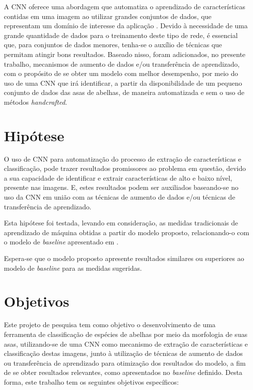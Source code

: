 \documentclass[
	12pt,				%
	oneside,			%
	a4paper,			%
	english,			%
	brazil				%
	]{abntex2ppgsi}
\begin{document}
A CNN oferece uma abordagem que automatiza o aprendizado de características contidas em uma imagem ao utilizar grandes conjuntos de dados, que representam um domínio de interesse da aplicação \cite{gonzalez2018deep}. Devido à necessidade de uma grande quantidade de dados para o treinamento deste tipo de rede, é essencial que, para conjuntos de dados menores, tenha-se o auxílio de técnicas que permitam atingir bons resultados. Baseado nisso, foram adicionados, no presente trabalho, mecanismos de aumento de dados e/ou transferência de aprendizado, com o propósito de se obter um modelo com melhor desempenho, por meio do uso de uma CNN que irá identificar, a partir da disponibilidade de um pequeno conjunto de dados das asas de abelhas, de maneira automatizada e sem o uso de métodos \textit{handcrafted}.

\section{Hipótese}
O uso de CNN para automatização do processo de extração de características e classificação, pode trazer resultados promissores ao problema em questão, devido a sua capacidade de identificar e extrair características de alto e baixo nível, presente nas imagens. E, estes resultados podem ser auxiliados baseando-se no uso da CNN em união com as técnicas de aumento de dados e/ou técnicas de transferência de aprendizado.

Esta hipótese foi testada, levando em consideração, as medidas tradicionais de aprendizado de máquina obtidas a partir do modelo proposto, relacionando-o com o modelo de \textit{baseline} apresentado em .

Espera-se que o modelo proposto apresente resultados similares ou superiores ao modelo de \textit{baseline} para as medidas sugeridas.

\section{Objetivos}
Este projeto de pesquisa tem como objetivo o desenvolvimento de uma ferramenta de classificação de espécies de abelhas por meio da morfologia de suas asas, utilizando-se de uma CNN como mecanismo de extração de características e classificação destas imagens, junto à utilização de técnicas de aumento de dados ou transferência de aprendizado para otimização dos resultados do modelo, a fim de se obter resultados relevantes, como apresentados no \textit{baseline} definido. Desta forma, este trabalho tem os seguintes objetivos específicos:
\end{document}
